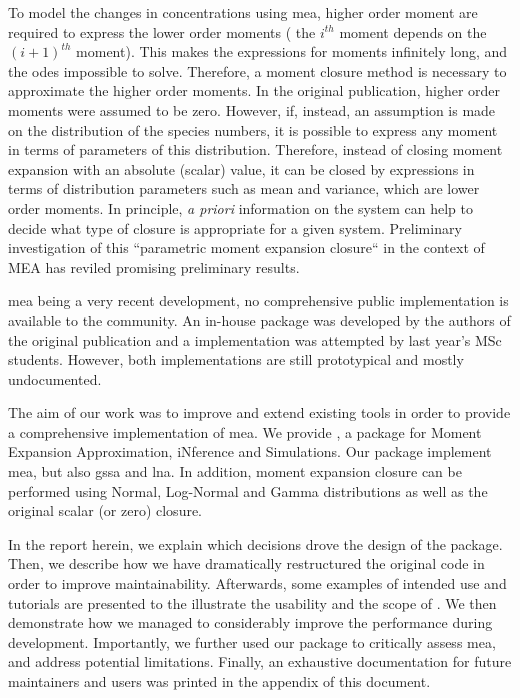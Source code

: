 To model the changes in concentrations using \gls{mea}, higher order moment are required to express the lower order moments
(\ie{} the $i^{th}$ moment depends on the $(i+1)^{th}$ moment).
This makes the expressions for moments infinitely long, and the \glspl{ode} impossible to solve.
Therefore, a moment closure method is necessary to approximate the higher order moments.
In the original publication\cite{ale_general_2013}, higher order moments were assumed to be zero.
However, if, instead, an assumption is made on the distribution of the species numbers, it is possible
to express any moment in terms of parameters of this distribution\cite{milner_moment_2011}.
Therefore, instead of closing moment expansion with an absolute (scalar) value, it can be closed by expressions in
terms of distribution parameters such as mean and variance, which are lower order moments.
In principle, \emph{a priori} information on the system can help to decide what type of closure is appropriate for a given system.
Preliminary investigation of this ``parametric moment expansion closure`` in the context of MEA has reviled promising preliminary results\cite{lakatos_preparation_2014}.

\gls{mea} being a very recent development, no comprehensive public implementation is available to the community.
An in-house \mat{} package was developed by the authors of the original publication and a \py{} implementation was attempted by last year's MSc students\cite{babtie_moment_2013}.
However, both implementations are still prototypical and mostly undocumented.
 
The aim of our work was to improve and extend existing tools in order to provide a comprehensive implementation of \gls{mea}.
We provide \means{}, a \py{} package for Moment Expansion Approximation, iNference and Simulations.
Our package implement \gls{mea}, but also \gls{gssa} and \gls{lna}.
In addition, moment expansion closure can be performed using Normal, Log-Normal and Gamma distributions as well as the original scalar (or zero) closure.

In the report herein, we explain which decisions drove the design of the package.
Then, we describe how we have dramatically restructured the original code in order to improve maintainability.
Afterwards, some examples of intended use and tutorials are presented to the illustrate the usability and the scope of \means.
We then demonstrate how we managed to considerably improve the performance during development.
Importantly, we further used our package to critically assess \gls{mea}, and address potential limitations.
Finally, an exhaustive documentation for future maintainers and users was printed in the appendix of this document.